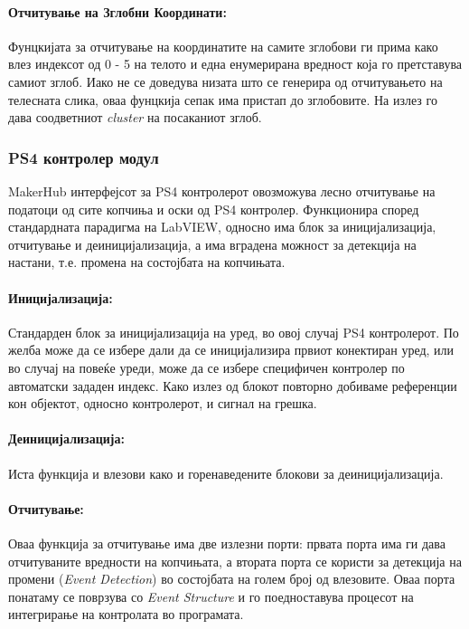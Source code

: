 \documentclass[12pt]{article}
\begin{document}
      \paragraph{Отчитување на Зглобни Координати:\\}
        Фунцкијата за отчитување на координатите на самите зглобови ги прима како влез индексот од 0 - 5 на телото и една енумерирана вредност која го претставува самиот зглоб. Иако не се доведува низата што се генерира од отчитувањето на телесната слика, оваа фунцкија сепак има пристап до зглобовите. На излез го дава соодветниот \textit{cluster} на посаканиот зглоб.

    \subsubsection{PS4 контролер модул}
      MakerHub интерфејсот за PS4 контролерот овозможува лесно отчитување на податоци од сите копчиња и оски од PS4 контролер. Функционира според стандардната парадигма на LabVIEW, односно има блок за иницијализација, отчитување и деиницијализација, а има вградена можност за детекција на настани, т.е. промена на состојбата на копчињата.

      \paragraph{Иницијализација:\\}
        Стандарден блок за иницијализација на уред, во овој случај PS4 контролерот. По желба може да се избере дали да се иницијализира првиот конектиран уред, или во случај на повеќе уреди, може да се избере специфичен контролер по автоматски зададен индекс. Како излез од блокот повторно добиваме референции кон објектот, односно контролерот, и сигнал на грешка.

      \paragraph{Деиницијализација:\\}
        Иста функција и влезови како и горенаведените блокови за деиницијализација.

      \paragraph{Отчитување:\\}
        Оваа функција за отчитување има две излезни порти: првата порта има ги дава отчитуваните вредности на копчињата, а втората порта се користи за детекција на промени (\textit{Event Detection}) во состојбата на голем број од влезовите. Оваа порта понатаму се поврзува со \textit{Event Structure} и го поедноставува процесот на интегрирање на контролата во програмата.
\end{document}
